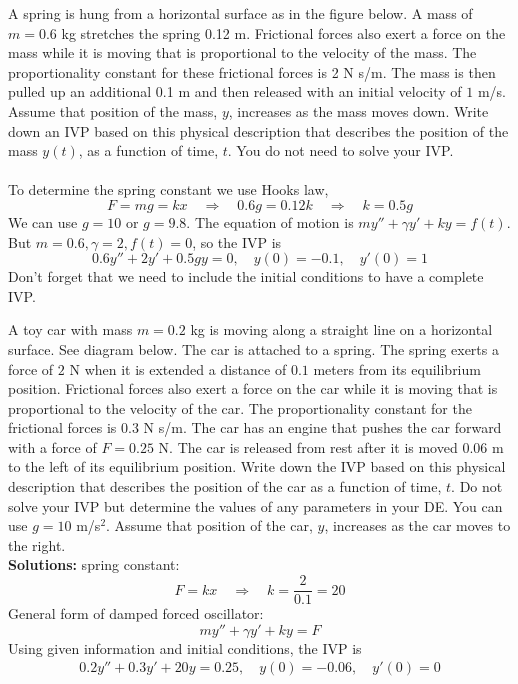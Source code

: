 \ifnum {}
\question[2] A spring is hung from a horizontal surface as in the figure below. A mass of $m=0.6$ kg stretches the spring 0.12 m. Frictional forces also exert a force on the mass while it is moving that is proportional to the velocity of the mass. The proportionality constant for these frictional forces is 2 N s/m. The mass is then pulled up an additional 0.1 m and then released with an initial velocity of $1$ m/s. Assume that position of the mass, $y$, increases as the mass moves down. Write down an IVP based on this physical description that describes the position of the mass $y(t)$, as a function of time, $t$. You do not need to solve your IVP. \\[4pt]
% 
\ifnum {} {\color{DarkBlue} \\[12pt] 
To determine the spring constant we use Hooks law, 
$$F = mg  = kx \quad \Rightarrow \quad 0.6g = 0.12k \quad \Rightarrow \quad k = 0.5g$$
We can use $g=10$ or $g=9.8$. The equation of motion is $my''+\gamma y' + ky = f(t)$.
But $m=0.6, \gamma = 2, f(t) = 0$, so the IVP is
$$0.6y'' + 2 y' + 0.5gy = 0, \quad y(0) = -0.1, \quad y'(0) = 1$$
Don't forget that we need to include the initial conditions to have a complete IVP.
} 
\else 
\vfill
\fi
\fi 





\ifnum {}
\question[3] A toy car with mass $m = 0.2$ kg is moving along a straight line on a horizontal surface. See diagram below. The car is attached to a spring. The spring exerts a force of $2$ N when it is extended a distance of $0.1$ meters from its equilibrium position. Frictional forces also exert a force on the car while it is moving that is proportional to the velocity of the car. The proportionality constant for the frictional forces is $0.3$ N s/m. The car has an engine that pushes the car forward with a force of $F = 0.25$ N. The car is released from rest after it is moved 0.06 m to the left of its equilibrium position. Write down the IVP based on this physical description that describes the position of the car as a function of time, $t$. Do not solve your IVP but determine the values of any parameters in your DE. You can use $g = 10$ m/s$^2$. Assume that position of the car, $y$, increases as the car moves to the right. \\


\ifnum {} {\color{DarkBlue} 
\textbf{Solutions:} spring constant:
$$F = kx \quad \Rightarrow \quad k = \frac{2}{0.1} = 20$$
General form of damped forced oscillator:
$$my'' + \gamma y' + ky = F$$
Using given information and initial conditions, the IVP is
\begin{align}
    0.2 y'' + 0.3 y' + 20y = 0.25, \quad y(0) = -0.06, \quad y'(0) = 0
\end{align}
} 
\else 
\vfill
\fi
\fi 


